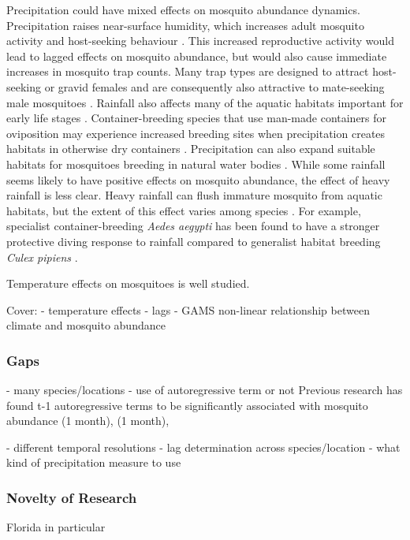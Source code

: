Precipitation could have mixed effects on mosquito abundance dynamics. Precipitation raises near-surface humidity, which increases adult mosquito activity and host-seeking behaviour \citep{Shaman2007}. This increased reproductive activity would lead to lagged effects on mosquito abundance, but would also cause immediate increases in mosquito trap counts. Many trap types are designed to attract host-seeking or gravid females and are consequently also attractive to mate-seeking male mosquitoes \citep{Li2016}. Rainfall also affects many of the aquatic habitats important for early life stages \citep{Shaman2007}. Container-breeding species that use man-made containers for oviposition may experience increased breeding sites when precipitation creates habitats in otherwise dry containers \citep{Keith2005}. Precipitation can also expand suitable habitats for mosquitoes breeding in natural water bodies \citep{Koenraadt2008}. While some rainfall seems likely to have positive effects on mosquito abundance, the effect of heavy rainfall is less clear. Heavy rainfall can flush immature mosquito from aquatic habitats, but the extent of this effect varies among species \citep{Koenraadt2008}. For example, specialist container-breeding \textit{Aedes aegypti} has been found to have a stronger protective diving response to rainfall compared to generalist habitat breeding \textit{Culex pipiens} \citep{Koenraadt2008}. 
	
Temperature effects on mosquitoes is well studied. 
	
Cover:
- temperature effects
- lags
- GAMS
non-linear relationship between climate and mosquito abundance \citep{Roiz2014}

\subsubsection{Gaps}
- many species/locations
- use of autoregressive term or not
Previous research has found t-1 autoregressive terms to be significantly associated with mosquito abundance \cite{Poh2019}(1 month), \citep{Xu2017} (1 month), 

- different temporal resolutions
- lag determination across species/location
- what kind of precipitation measure to use

\subsubsection{Novelty of Research}

Florida in particular

